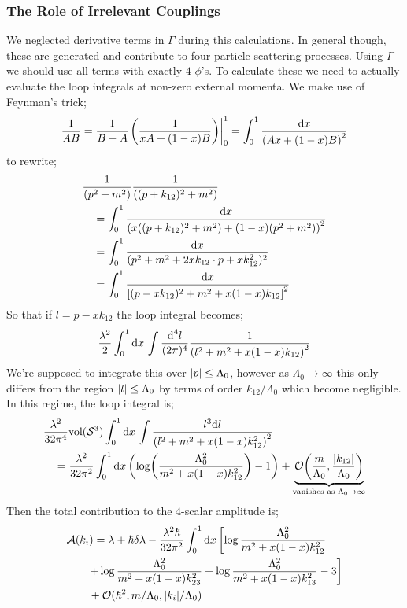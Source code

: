 \subsubsection{The Role of Irrelevant Couplings}
We neglected derivative terms in $\Gamma$ during this calculations. In general though, these are generated and contribute to four particle scattering processes. Using $\Gamma$ we should use all terms with exactly $4$ $\phi$'s. To calculate these we need to actually evaluate the loop integrals at non-zero external momenta. We make use of Feynman's trick;
\begin{equation*}
\frac{1}{AB} = \frac{1}{B - A}\left.\left(\frac{1}{xA + (1 - x)B}\right)\right|_{0}^{1} = \int_0^{1}{\frac{\ud x}{\left(Ax + (1 - x)B\right)^2}}
\end{equation*}
to rewrite;
\begin{align*}
&\frac{1}{(p^2 + m^2)}\frac{1}{\left((p + k_{12})^2 + m^2\right)} \\
& \quad = \int_0^{1}{\frac{\ud x}{\left(x\left((p + k_{12})^2 + m^2\right) + (1 - x)(p^2 + m^2)\right)^2}} \\
& \quad = \int_{0}^{1}{\frac{\ud x}{(p^2 + m^2 + 2x k_{12}\cdot p + xk_{12}^2)^2}} \\
& \quad = \int_{0}^{1}{\frac{\ud x}{\left[(p - xk_{12})^2 + m^2 + x(1 - x)k_{12}\right]^2}}
\end{align*}
So that if $l = p - xk_{12}$ the loop integral becomes;
\begin{equation*}
\frac{\lambda^2}{2}\int_0^{1}{\upd{x}\int{\frac{\ud^4 l}{(2\pi)^4}\frac{1}{\left(l^2 + m^2 + x(1 - x)k_{12}\right)^2}}}
\end{equation*}
We're supposed to integrate this over $\abs{p} \leq \Lambda_0$, however as $\Lambda_0 \rightarrow \infty$ this only differs from the region $\abs{l} \leq \Lambda_0$ by terms of order $k_{12} / \Lambda_0$ which become negligible. In this regime, the loop integral is;
\begin{align*}
&\frac{\lambda^2}{32\pi^4}\text{vol}(\mS^3)\int_0^{1}{\upd{x}\int{\frac{l^3 \ud l}{\left(l^2 + m^2 + x(1 - x)k_{12}^2\right)^2}}} \\
&\quad = \frac{\lambda^2}{32\pi^2}\int_0^{1}{\upd{x}\left(\log\left(\frac{\Lambda_0^2}{m^2 + x(1 - x)k_{12}^{2}}\right) - 1\right)} + \underbrace{\mO\left(\frac{m}{\Lambda_0}, \frac{\abs{k_{12}}}{\Lambda_0}\right)}_{\text{vanishes as }\Lambda_0 \rightarrow \infty}
\end{align*}
Then the total contribution to the $4$-scalar amplitude is;
\begin{align*}
&\mathcal{A}(k_i) = \lambda + \hbar \delta \lambda - \frac{\lambda^2 \hbar}{32 \pi^2}\int_0^{1}{\upd{x}}\left[ \log \frac{\Lambda_0^2}{m^2 + x(1 - x)k_{12}^2} \right.\\
&\qquad \left. + \log \frac{\Lambda_0^2}{m^2 + x(1 - x)k_{23}^2} + \log \frac{\Lambda_0^2}{m^2 + x(1 - x)k_{13}^2} - 3\right]  \\
& \qquad + \mO(\hbar^2, m/\Lambda_0, \abs{k_i}/\Lambda_0)
\end{align*}
